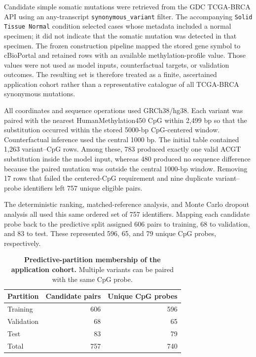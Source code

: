 \documentclass[10pt,letterpaper,twocolumn]{article}
\begin{document}
Candidate simple somatic mutations were retrieved from the GDC
TCGA-BRCA API using an any-transcript
\texttt{synonymous\_variant} filter. The accompanying
\texttt{Solid Tissue Normal} condition selected cases whose metadata
included a normal specimen; it did not indicate that the somatic
mutation was detected in that specimen. The frozen construction
pipeline mapped the stored gene symbol to cBioPortal and retained rows
with an available methylation-profile value. Those values were not used
as model inputs, counterfactual targets, or validation outcomes. The
resulting set is therefore treated as a finite, ascertained application
cohort rather than a representative catalogue of all TCGA-BRCA
synonymous mutations.

All coordinates and sequence operations used GRCh38/hg38. Each variant
was paired with the nearest HumanMethylation450 CpG within 2,499 bp so
that the substitution occurred within the stored 5000-bp CpG-centered
window. Counterfactual inference used the central 1000 bp. The initial
table contained 1,263 variant--CpG rows. Among these, 783 produced
exactly one valid ACGT substitution inside the model input, whereas 480
produced no sequence difference because the paired mutation was outside
the central 1000-bp window. Removing 17 rows that failed the
centered-CpG requirement and nine duplicate variant--probe identifiers
left 757 unique eligible pairs.

The deterministic ranking, matched-reference analysis, and Monte Carlo
dropout analysis all used this same ordered set of 757 identifiers.
Mapping each candidate probe back to the predictive split assigned 606
pairs to training, 68 to validation, and 83 to test. These represented
596, 65, and 79 unique CpG probes, respectively.

\begin{table}[H]
\centering
\caption{\textbf{Predictive-partition membership of the application
cohort.} Multiple variants can be paired with the same CpG probe.}
\label{tab:candidate-split-membership}
\small
\begin{tabular}{lrr}
\hline
Partition & Candidate pairs & Unique CpG probes \\
\hline
Training   & 606 & 596 \\
Validation & 68  & 65  \\
Test       & 83  & 79  \\
\hline
Total      & 757 & 740 \\
\hline
\end{tabular}
\end{table}
\end{document}
